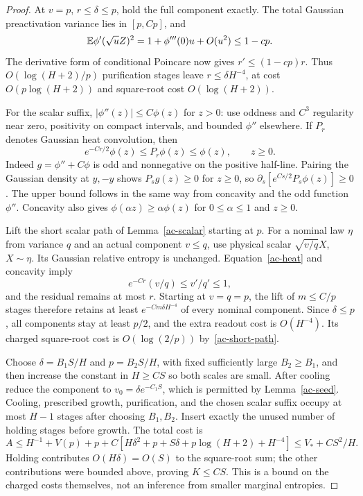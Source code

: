 \begin{proof}
At $v=p$, $r\le\delta\le p$, hold the full component exactly.
The total Gaussian preactivation variance lies in $[p,Cp]$, and
\[
 \mathbb E\phi'(\sqrt uZ)^2=1+\phi'''(0)u+O(u^2)\le1-cp.
\]
The derivative form of conditional Poincare now gives
$r'\le(1-cp)r$. Thus $O(\log(H+2)/p)$ purification stages leave
$r\le\delta H^{-4}$, at cost $O(p\log(H+2))$ and square-root
cost $O(\log(H+2))$.

For the scalar suffix, $|\phi''(z)|\le C\phi(z)$ for $z>0$:
use oddness and $C^3$ regularity near zero, positivity on compact
intervals, and bounded $\phi''$ elsewhere. If $P_r$ denotes Gaussian
heat convolution, then
\begin{equation}\label{ac-heat}
 e^{-Cr/2}\phi(z)\le P_r\phi(z)\le\phi(z),\qquad z\ge0.
\end{equation}
Indeed $g=\phi''+C\phi$ is odd and nonnegative on the positive
half-line. Pairing the Gaussian density at $y,-y$ shows
$P_sg(z)\ge0$ for $z\ge0$, so
$\partial_s[e^{Cs/2}P_s\phi(z)]\ge0$. The upper bound follows
in the same way from concavity and the odd function $\phi''$.
Concavity also gives $\phi(\alpha z)\ge\alpha\phi(z)$ for
$0\le\alpha\le1$ and $z\ge0$.

Lift the short scalar path of Lemma~\ref{ac-scalar} starting at $p$.
For a nominal law $\eta$ from variance $q$ and an actual component
$v\le q$, use physical scalar $\sqrt{v/q}X$, $X\sim\eta$.
Its Gaussian relative entropy is unchanged. Equation~\eqref{ac-heat}
and concavity imply
\[
 e^{-Cr}(v/q)\le v'/q'\le1,
\]
and the residual remains at most $r$. Starting at $v=q=p$, the
lift of $m\le C/p$ stages therefore retains at least
$e^{-Cm\delta H^{-4}}$ of every nominal component. Since
$\delta\le p$, all components stay at least $p/2$, and the extra
readout cost is $O(H^{-4})$. Its charged square-root cost is
$O(\log(2/p))$ by~\eqref{ac-short-path}.

Choose $\delta=B_1S/H$ and $p=B_2S/H$, with fixed sufficiently
large $B_2\ge B_1$, and then increase the constant in $H\ge CS$
so both scales are small. After cooling reduce the component to
$v_0=\delta e^{-C_1S}$, which is permitted by Lemma~\ref{ac-seed}.
Cooling, prescribed growth, purification, and the chosen scalar
suffix occupy at most $H-1$ stages after choosing $B_1,B_2$.
Insert exactly the unused number of holding stages before growth.
The total cost is
\[
 A\le H^{-1}+V(p)+p+
 C[H\delta^2+p+S\delta+p\log(H+2)+H^{-4}]
 \le V_*+CS^2/H.
\]
Holding contributes $O(H\delta)=O(S)$ to the square-root sum;
the other contributions were bounded above, proving $K\le CS$.
This is a bound on the charged costs themselves, not an inference
from smaller marginal entropies.


\end{proof}
